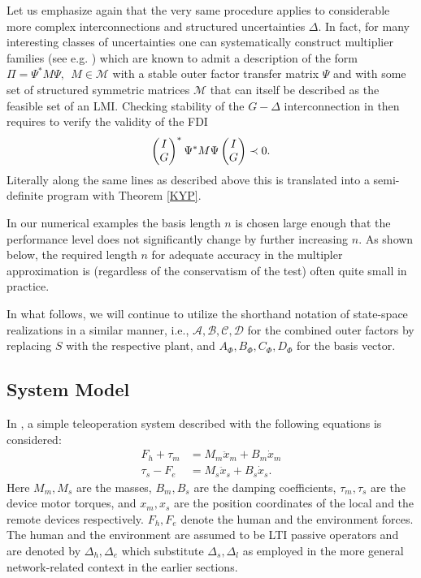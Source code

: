 Let us emphasize again that the very same procedure applies to considerable more
complex interconnections and structured uncertainties $\Delta$. In fact, for many
interesting classes of uncertainties one can systematically construct multiplier
families (see e.g. \cite{megretski}) which are known to admit a description of the
form $\Pi = \Psi^*M\Psi,\ \ M\in\mathcal{M}$ with a stable outer factor transfer matrix
$\Psi$ and with some set of structured symmetric matrices ${\mathcal{M}}$ that can itself
be described as the feasible set of an LMI. Checking stability of the $G-\Delta$
interconnection in  then requires to verify the validity of the FDI
\begin{equation*}
\begin{pmatrix}I\\G\end{pmatrix}^*\Psi^*{M}\Psi\begin{pmatrix}I\\G\end{pmatrix} \prec 0.
\end{equation*}
Literally along the same lines as described above this is translated into a semi-definite 
program with Theorem \ref{KYP}.

\begin{rem}
In our numerical examples the basis length $n$ is chosen large enough that the performance level 
does not significantly change by further increasing $n$. As shown below, 
the required length $n$ for adequate accuracy in the multipler approximation
is (regardless of the conservatism of the test) often quite small in practice. 
\end{rem}

In what follows, we will continue to utilize the shorthand notation of
state-space realizations in a similar manner, i.e., $\mathcal{A,B,C,D}$ for
the combined outer factors by replacing $S$ with the respective plant, and
$A_\Phi,B_\Phi,C_\Phi,D_\Phi$ for the basis vector.


\subsection{System Model}
In \cite{willaert}, a simple teleoperation system described with the following equations is 
considered:
\begin{align*}
F_h+\tau_m &= M_m \ddot{x}_m + B_m \dot{x}_m\\
\tau_s -F_e &= M_s \ddot{x}_s + B_s \dot{x}_s.
\end{align*}
Here $M_m,M_s$ are the masses, $B_m,B_s$ are the damping coefficients, $\tau_m,\tau_s$ 
are the device motor torques, {and} $x_m,x_s$ are the position coordinates of the local 
and the remote devices respectively. $F_h,F_e$  denote the human and the environment forces. 
The human and the environment are assumed to be LTI passive operators {and} {are denoted by 
$\Delta_h,\Delta_e$ which substitute $\Delta_s,\Delta_l$ as employed in the more general 
network-related context in the earlier sections.}

